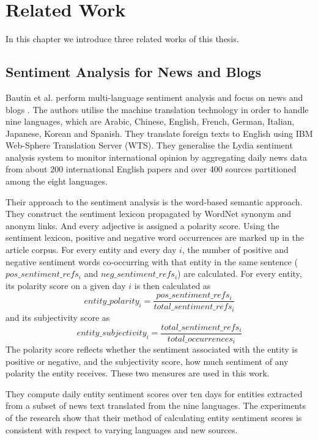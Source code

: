 \chapter{Related Work}
In this chapter we introduce three related works of this thesis.
\section{Sentiment Analysis for News and Blogs}
Bautin et al. perform multi-language sentiment analysis and focus on news and blogs \cite{news_blogs}.
The authors utilise the machine translation technology in order to handle nine languages, which are Arabic, Chinese, English, French, German, Italian, Japanese, Korean and Spanish.
They translate foreign texts to English using IBM Web-Sphere Translation Server (WTS).
They generalise the Lydia sentiment analysis system \cite{lydia} to monitor international opinion by aggregating daily news data from about 200 international English papers and over 400 sources partitioned among the eight languages. 

Their approach to the sentiment analysis is the word-based semantic approach.
They construct the sentiment lexicon propagated by WordNet \cite{wordnet} synonym and anonym links.
And every adjective is assigned a polarity score.
Using the sentiment lexicon, positive and negative word occurrences are marked up in the article corpus.
For every entity and every day $i$, the number of positive and negative sentiment words co-occurring with that entity in the same sentence ($pos\_sentiment\_refs_i$ and $neg\_sentiment\_refs_i$) are calculated.
For every entity, its polarity score on a given day $i$ is then calculated as 
\begin{equation}
entity\_polarity_i = \frac{pos\_sentiment\_refs_i}{total\_sentiment\_refs_i}
\end{equation}
and its subjectivity score as 
\begin{equation}
entity\_subjectivity_i = \frac{total\_sentiment\_refs_i}{total\_occurrences_i}
\end{equation}
The polarity score reflects whether the sentiment associated with the entity is positive or negative, and the subjectivity score, how much sentiment of any polarity the entity receives.
These two measures are used in this work.

They compute daily entity sentiment scores over ten days for entities extracted from a subset of news text translated from the nine languages.
The experiments of the research show that their method of calculating entity sentiment scores is consistent with respect to varying languages and new sources.

